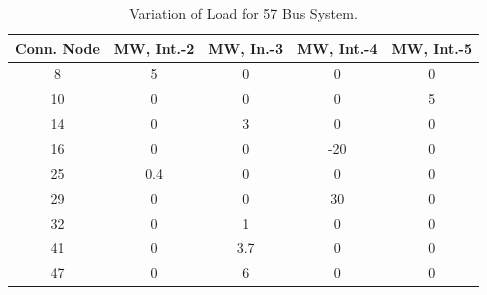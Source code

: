 \documentclass[preprint,12pt,3p]{elsarticle}
\begin{document}
	\begin{table}[ht] 
		
		\caption{Variation of Load for 57 Bus System.} %
		
		\centering %
		
		\begin{tabular}{| c | c | c | c | c |} %
			
			\hline\hline %
			
			Conn. Node & MW, Int.-2 & MW, In.-3 & MW, Int.-4  & MW, Int.-5 \\ [0.5ex] %
			
			
			\hline %
			
			8 &	5 &	0 &	0 &	0 \\ %
			\hline
			10 &	0 &	0 &	0 &	5 \\ %
			\hline
			14 &	0 &	3 &	0 &	0 \\ %
			\hline
			16 &	0 &	0 &	-20 &	0 \\ %
			\hline
			25 &	0.4 &	0 &	0 &	0 \\ %
			\hline
			29 &	0 &	0 &	30 &	0 \\ %
			\hline
			32 &	0 &	1 &	0 &	0 \\ %
			\hline
			41 &	0 &	3.7 &	0 &	0 \\ %
			\hline
			47 &	0 &	6 &	0 &	0 \\ %
			\hline
		\end{tabular} 
		
		\label{table:57LASCOPFLoadModified} %
		
	\end{table}
\end{document}

